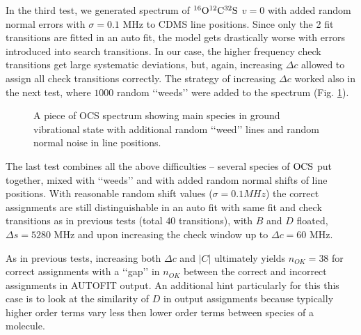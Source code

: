 \documentclass[11pt]{article}
\begin{document}
In the third test, we generated spectrum of $\rm ^{16}O^{12}C^{32}S$ $v = 0$ with added random normal errors with $\sigma = 0.1$ MHz to CDMS line positions. %
Since only the 2 fit transitions are fitted in an auto fit, the model gets drastically worse with errors introduced into search transitions. In our case, the higher frequency check transitions get large systematic deviations, but, again, increasing $\Delta c$ allowed to assign all check transitions correctly. The strategy of increasing $\Delta c$ worked also in the next test, where $1000$ random \lq\lq{}weeds\rq\rq{} were added to the spectrum (Fig. \ref{fig:weeds}).

\begin{figure}[h]
\caption{\small A piece of OCS spectrum showing main species in ground vibrational state with additional random \lq\lq{}weed\rq\rq{} lines and random normal noise in line positions.}
\label{fig:weeds}
\end{figure}

The last test combines all the above difficulties -- several species of $\rm OCS$ put together, mixed with \lq\lq{}weeds\rq\rq{} and with added random normal shifts of line positions. With reasonable random shift values ($\sigma = 0.1 MHz$) the correct assignments are still distinguishable in an auto fit with same fit and check transitions as in previous tests (total $40$ transitions), with $B$ and $D$ floated, $\Delta s = 5280$ MHz and upon increasing the check window up to $\Delta c = 60$ MHz. 

As in previous tests, increasing both $\Delta c$ and $|C|$ ultimately yields $n_{OK} = 38$ for correct assignments with a  \lq\lq{}gap\rq\rq{} in $n_{OK}$ between the correct and incorrect assignments in AUTOFIT output. An additional hint particularly for this this case is to look at the similarity of $D$ in output assignments because typically higher order terms vary less then lower order terms between species of a molecule.
\end{document}
